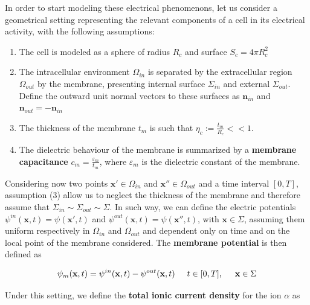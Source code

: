 \documentclass[a4paper]{article}
\begin{document}
In order to start modeling these electrical phenomenons, let us consider a geometrical setting representing the relevant components of a cell in its electrical activity, with the following assumptions:

\begin{enumerate}
	\item The cell is modeled as a sphere of radius $R_c$ and surface $ S_c = 4\pi R_c^2$
	
	\item The intracellular environment $\Omega_{in}$ is separated by the extracellular region $\Omega_{out}$ by the membrane, presenting internal surface $\Sigma_{in}$ and external $\Sigma_{out}$. Define the outward unit normal vectors to these surfaces as $\textbf{n}_{in}$  and  $\textbf{n}_{out} = - \textbf{n}_{in}$
	
	\item The thickness of the membrane $t_m$ is such that $ \eta_c := \frac{t_m}{R_c} << 1$. 
	
	\item The dielectric behaviour of the membrane is summarized by a \textbf{membrane capacitance}  $ c_m = \frac{\varepsilon_m}{t_m} $, where $\varepsilon_m$ is the dielectric constant of the membrane.
\end{enumerate}

Considering now two points $ \textbf{x}' \in \Omega_{in}$ and $ \textbf{x}'' \in \Omega_{out}$ and a time interval $ [0,T]$, assumption (3) allow us to neglect the thickness of the membrane and therefore assume that $\Sigma_{in} \sim \Sigma_{out}  \sim \Sigma $. In such way, we can define the electric potentials $ \psi^{in} (\textbf{x},t) = \psi(\textbf{x}',t) $ and  $ \psi^{out} (\textbf{x},t) = \psi(\textbf{x}'',t) $, with $\textbf{x} \in \Sigma$, assuming them uniform respectively in $\Omega_{in}$ and $\Omega_{out}$ and dependent only on time and on the local point of the membrane considered. The \textbf{membrane potential} is then defined as

\begin{equation}
\psi_m (\textbf{x},t) = \psi^{in} (\textbf{x},t) -  \psi^{out} (\textbf{x},t) \hspace{0.5 cm}  t \in [0,T], \hspace{0.5 cm} \textbf{x} \in \Sigma
\end{equation}



Under this setting, we define the \textbf{total ionic current density} for the  ion $\alpha$ as
\end{document}
